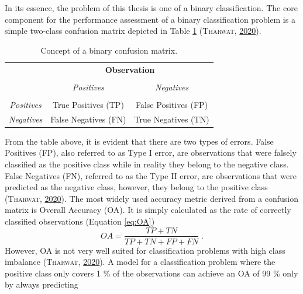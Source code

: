 \documentclass[a4paper,11pt]{article}
\begin{document}
In its essence, the problem of this thesis is one of a binary classification.
The core component for the performance assessment of a binary classification
problem is a simple two-class confusion matrix depicted in Table \ref{tab:03-methods-conf}
\textsc{(\textnormal{\textsc{Tharwat}}, \textnormal{\protect\hyperlink{ref-tharwat2020}{2020}})}.
\begin{table}[H]

\caption{\label{tab:03-methods-conf}Concept of a binary confusion matrix.}
\centering
\fontsize{10}{12}\selectfont
\fontsize{10}{12}\selectfont
\begin{tabular}[t]{ccc}
\toprule
\multicolumn{1}{c}{\textbf{}} & \multicolumn{2}{c}{\textbf{Observation}} \\
\cmidrule(l{3pt}r{3pt}){2-3}
 &  & \\
\midrule
 & \textit{Positives} & \textit{Negatives}\\
\addlinespace[0.3em]
\multicolumn{3}{l}{\textbf{Prediction}}\\
\hspace{1em}\textit{Positives} & True Positives (TP) & False Positives (FP)\\
\hspace{1em}\textit{Negatives} & False Negatives (FN) & True Negatives (TN)\\
\bottomrule
\end{tabular}
\end{table}
From the table above, it is evident that there are two types of errors.
False Positives (FP), also referred to as Type I error,
are observations that were falsely classified as the positive class while in
reality they belong to the negative class. False Negatives (FN), referred to
as the Type II error, are observations that were predicted as the negative
class, however, they belong to the positive class \textsc{(\textnormal{\textsc{Tharwat}}, \textnormal{\protect\hyperlink{ref-tharwat2020}{2020}})}.
The most widely used accuracy metric derived from a confusion matrix
is Overall Accuracy (OA). It is simply calculated as the rate of correctly
classified observations (Equation \eqref{eq:OA})
\begin{equation}
OA = \frac{TP+TN}{TP+TN+FP+FN}\;.
\label{eq:OA}
\end{equation}
However, OA is not very well suited for classification problems with high class
imbalance \textsc{(\textnormal{\textsc{Tharwat}}, \textnormal{\protect\hyperlink{ref-tharwat2020}{2020}})}. A model for a classification problem where the positive class only
covers 1 \% of the observations can achieve an OA of 99 \% only by always predicting
\end{document}
